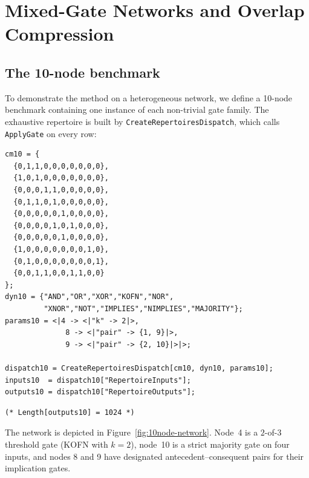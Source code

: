 \documentclass[11pt]{article}
\begin{document}
\section{Mixed-Gate Networks and Overlap Compression}\label{sec:mixed}

\subsection{The 10-node benchmark}\label{sec:10node}

To demonstrate the method on a heterogeneous network, we define a 10-node
benchmark containing one instance of each non-trivial gate family.
The exhaustive repertoire is built by \texttt{CreateRepertoiresDispatch},
which calls \texttt{ApplyGate} on every row:

\begin{lstlisting}[style=MathematicaStyle,caption={Ten-node mixed-gate network definition and repertoire.}]
cm10 = {
  {0,1,1,0,0,0,0,0,0,0},
  {1,0,1,0,0,0,0,0,0,0},
  {0,0,0,1,1,0,0,0,0,0},
  {0,1,1,0,1,0,0,0,0,0},
  {0,0,0,0,0,1,0,0,0,0},
  {0,0,0,0,1,0,1,0,0,0},
  {0,0,0,0,0,1,0,0,0,0},
  {1,0,0,0,0,0,0,0,1,0},
  {0,1,0,0,0,0,0,0,0,1},
  {0,0,1,1,0,0,1,1,0,0}
};
dyn10 = {"AND","OR","XOR","KOFN","NOR",
         "XNOR","NOT","IMPLIES","NIMPLIES","MAJORITY"};
params10 = <|4 -> <|"k" -> 2|>,
              8 -> <|"pair" -> {1, 9}|>,
              9 -> <|"pair" -> {2, 10}|>|>;

dispatch10 = CreateRepertoiresDispatch[cm10, dyn10, params10];
inputs10  = dispatch10["RepertoireInputs"];
outputs10 = dispatch10["RepertoireOutputs"];
\end{lstlisting}
\begin{lstlisting}[style=MathematicaOutput]
(* Length[outputs10] = 1024 *)
\end{lstlisting}

The network is depicted in Figure~\ref{fig:10node-network}.
Node~4 is a $2$-of-$3$ threshold gate (KOFN with $k=2$),
node~10 is a strict majority gate on four inputs, and nodes 8 and 9
have designated antecedent--consequent pairs for their implication gates.
\end{document}
